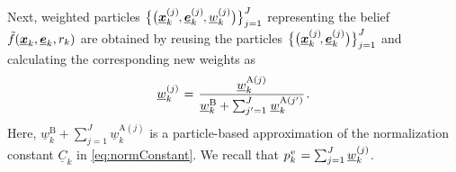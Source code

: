 \documentclass[10pt, twoside, romanappendices]{IEEEtran}
\providecommand{\ist}{\hspace*{.3mm}}
\providecommand{\rmv}{\hspace*{-.3mm}}
\providecommand{\sist}{\hspace*{.15mm}}
\begin{document}
Next, weighted \vspace{-.5mm} particles $\big\{ \big( \underline{\V{x}}^{(j)}_{k} \rmv, \underline{\V{e}}^{(j)}_{k} \rmv, \underline{w}^{(j)}_{k} \big) \big\}_{j=1}^{J}$ representing the\vspace{.15mm} belief $\tilde{f}(\underline{\bm{x}}_{k},\underline{\bm{e}}_{k},r_{k})$ 
are obtained by reusing the particles $\big\{ \big( \underline{\V{x}}^{(j)}_{k}\rmv\rmv, \underline{\V{e}}^{(j)}_{k} \big) \big\}_{j=1}^{J}$\vspace{.5mm} and calculating the corresponding new weights 
\vspace{-2mm}
as
\begin{equation}
\underline{w}^{(j)}_{k} \ist=\ist \frac{\underline{w}^{\text{A}(j)}_{k}}{\underline{w}^{\text{B}}_{k}+\sum^{J}_{j'=1} \ist \underline{w}^{\text{A}(j')}_{k}} \ist.
\label{eq:normlization}
\vspace{0mm}
\end{equation}
Here, $\underline{w}^{\text{B}}_{k}+\sum^{J}_{j=1} \underline{w}^{\text{A}(j)}_{k}$ is a particle-based approximation of the normalization constant $\underline{C}_{k}$ in \eqref{eq:normConstant}. 
We recall that $p^{\sist\text{e}}_{k} \ist= \sum^{J}_{j=1} \underline{w}^{(j)}_{k}$. 
\end{document}
